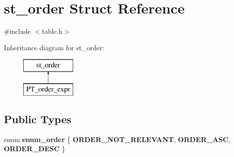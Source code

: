 \hypertarget{structst__order}{}\section{st\+\_\+order Struct Reference}
\label{structst__order}


{\ttfamily \#include $<$table.\+h$>$}

Inheritance diagram for st\+\_\+order\+:\begin{figure}[H]
\begin{center}
\leavevmode
\includegraphics[height=2.000000cm]{structst__order}
\end{center}
\end{figure}
\subsection*{Public Types}
\begin{DoxyCompactItemize}
\item 
\mbox{\label{structst__order_a9d8ca5fd81a20156976fa798cec56739}} 
enum {\bfseries enum\+\_\+order} \{ {\bfseries O\+R\+D\+E\+R\+\_\+\+N\+O\+T\+\_\+\+R\+E\+L\+E\+V\+A\+NT}, 
{\bfseries O\+R\+D\+E\+R\+\_\+\+A\+SC}, 
{\bfseries O\+R\+D\+E\+R\+\_\+\+D\+E\+SC}
 \}
\end{DoxyCompactItemize}
